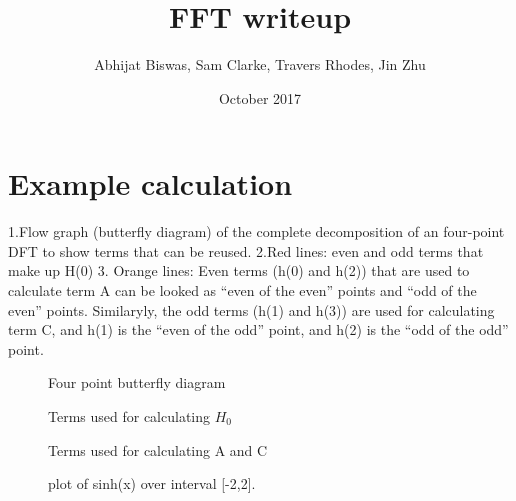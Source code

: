 \documentclass{article}
\title{FFT writeup}
\author{Abhijat Biswas, Sam Clarke, Travers Rhodes, Jin Zhu}
\date{October 2017}
\begin{document}
\maketitle


\section{Example calculation}

1.Flow graph (butterfly diagram) of the complete decomposition of an four-point DFT to show terms that can be reused.
2.Red lines: even and odd terms that make up H(0)
3. Orange lines: Even terms (h(0) and h(2)) that are used to calculate term A can be looked as ``even of the even'' points and ``odd of the even'' points. Similaryly, the odd terms (h(1) and h(3)) are used for calculating term C, and h(1) is the ``even of the odd'' point, and h(2) is the ``odd of the odd'' point.


\begin{figure}[H]
  \caption{Four point butterfly diagram}
  \label{fig:butterfly_all}
\end{figure}

\begin{figure}[H]
  \caption{Terms used for calculating $H_0$}
  \label{fig:butterfly_h0}
\end{figure}

\begin{figure}[H]
  \caption{Terms used for calculating A and C}
  \label{fig:butterfly_abcdTerms}
\end{figure}


\begin{figure}[H]
  \caption{plot of sinh(x) over interval [-2,2].}
  \label{fig:question1b}
\end{figure}
\end{document}
